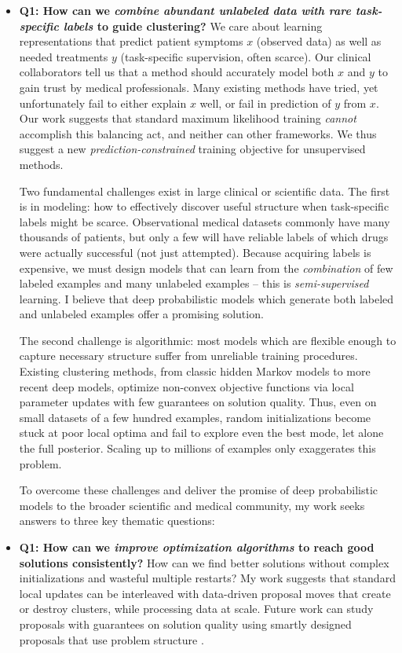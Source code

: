 \documentclass[11pt,letterpaper]{article}
\begin{document}
\begin{itemize}

\item \textbf{Q1: How can we \emph{combine abundant unlabeled data with rare task-specific labels} to guide clustering?}
We care about learning representations that predict patient symptoms $x$ (observed data) as well as needed treatments $y$ (task-specific supervision, often scarce). Our clinical collaborators tell us that a method should accurately model both $x$ and $y$ to gain trust by medical professionals. Many existing methods have tried, yet unfortunately fail to either explain $x$ well, or fail in prediction of $y$ from $x$. 
Our work suggests that standard maximum likelihood training \emph{cannot} accomplish this balancing act, and neither can other frameworks. We thus suggest a new \emph{prediction-constrained} training objective for unsupervised methods.


Two fundamental challenges exist in large clinical or scientific data. The first is in modeling: how to effectively discover useful structure when task-specific labels might be scarce. Observational medical datasets commonly have many thousands of patients, but only a few will have reliable labels of which drugs were actually successful (not just attempted).
Because acquiring labels is expensive, we must design models that can learn from the \emph{combination} of few labeled examples and many unlabeled examples -- this is \emph{semi-supervised} learning. I believe that deep probabilistic models which generate both labeled and unlabeled examples offer a promising solution.

The second challenge is algorithmic: 
most models which are flexible enough to capture necessary structure suffer from unreliable training procedures.
Existing clustering methods, from classic hidden Markov models to more recent deep models, optimize non-convex objective functions via local parameter updates with few guarantees on solution quality. Thus, even on small datasets of a few hundred examples, random initializations become stuck at poor local optima and fail to explore even the best mode, let alone the full posterior. Scaling up to millions of examples only exaggerates this problem.

To overcome these challenges and deliver the promise of deep probabilistic models to the broader scientific and medical community, my work seeks answers to three key thematic questions:


\item \textbf{Q1: How can we \emph{improve optimization algorithms} to reach good solutions consistently?} How can we find better solutions without complex initializations and wasteful multiple restarts? My work suggests that standard local updates can be interleaved with data-driven proposal moves that create or destroy clusters, while processing data at scale. Future work can study proposals with guarantees on solution quality using smartly designed proposals that use problem structure \cite{acharyya2013bregmanTriangleIneq}. 


\end{itemize}
\end{document}
